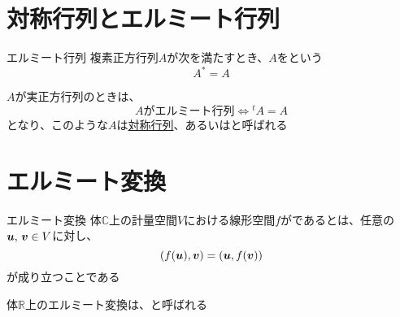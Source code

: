 \documentclass[../../../topic_linear-algebra]{subfiles}
\begin{document}
\sectionline
\section{対称行列とエルミート行列}

\begin{definition}{エルミート行列}
  複素正方行列$A$が次を満たすとき、$A$をという
  \begin{equation*}
    A^* = A
  \end{equation*}
\end{definition}

$A$が実正方行列のときは、
\begin{equation*}
  A\text{がエルミート行列} \Longleftrightarrow {}^tA = A
\end{equation*}
となり、このような$A$は\hyperref[def:symmetric-matrix]{対称行列}、あるいはと呼ばれる

\sectionline
\section{エルミート変換}

\begin{definition}{エルミート変換}
  体$\mathbb{C}$上の計量空間$V$における線形空間$f$がであるとは、任意の$\vb*{u},\,\vb*{v} \in V$に対し、
  \begin{equation*}
    (f(\vb*{u}), \vb*{v}) = (\vb*{u}, f(\vb*{v}))
  \end{equation*}
  が成り立つことである
\end{definition}

体$\mathbb{R}$上のエルミート変換は、と呼ばれる
\end{document}
